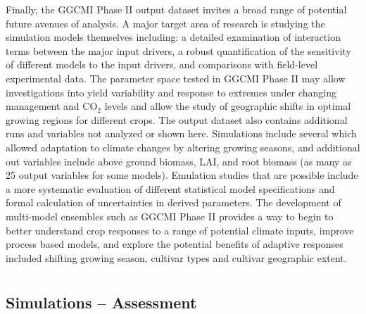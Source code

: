 \documentclass[esd, final]{copernicus} %
\begin{document}
{%
Finally, the GGCMI Phase II output dataset invites a broad range of potential future avenues of analysis. A major target area of research is studying the simulation models themselves including: a detailed examination of interaction terms between the major input drivers, a robust quantification of the sensitivity of different models to the input drivers, and comparisons with field-level experimental data. The parameter space tested in GGCMI Phase II may allow investigations into yield variability and response to extremes under changing management and CO$_2$ levels and allow the study of geographic shifts in optimal growing regions for different crops. The output dataset also contains additional runs and variables not analyzed or shown here. Simulations include several which allowed adaptation to climate changes by altering growing seasons, and additional out variables include above ground biomass, LAI, and root biomass (as many as 25 output variables for some models). Emulation studies that are possible include a more systematic evaluation of different statistical model specifications and formal calculation of uncertainties in derived parameters. The development of multi-model ensembles such as GGCMI Phase II provides a way to begin to better understand crop responses to a range of potential climate inputs, improve process based models, and explore the potential benefits of adaptive responses included shifting growing season, cultivar types and cultivar geographic extent.}





\appendix
\section{}
\subsection{Simulations -- Assessment}     %
\label{A:1}
\end{document}
